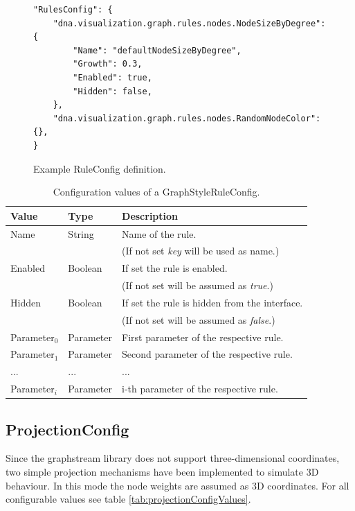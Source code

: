 \begin{figure} [h]
\begin{lstlisting}
"RulesConfig": {
	"dna.visualization.graph.rules.nodes.NodeSizeByDegree": {
		"Name": "defaultNodeSizeByDegree",
		"Growth": 0.3,
		"Enabled": true,
		"Hidden": false,
	},
	"dna.visualization.graph.rules.nodes.RandomNodeColor": {},
}
\end{lstlisting}
\caption{Example RuleConfig definition.}
\label{config:exampleRuleConfig}
\end{figure}

\begin{table}[h]
\caption{Configuration values of a GraphStyleRuleConfig.}
\centering
\begin{tabular}[h]{|l|l|l|}\hline
	\textbf{Value} & \textbf{Type} & \textbf{Description}\\
	\hline
	Name & String & Name of the rule.\\
	& & (If not set \emph{key} will be used as name.)\\
	\hline
	Enabled & Boolean & If set the rule is enabled.\\
	& & (If not set will be assumed as \emph{true}.)\\
	\hline
	Hidden & Boolean & If set the rule is hidden from the interface.\\
	& & (If not set will be assumed as \emph{false}.)\\
	\hline
	Parameter$_0$ & Parameter & First parameter of the respective rule.\\
	\hline
	Parameter$_1$ & Parameter & Second parameter of the respective rule.\\
	\hline
	... & ... & ...\\
	\hline	
	Parameter$_i$ & Parameter & i-th parameter of the respective rule.\\
	\hline
\end{tabular}
\label{tab:graphStyleRuleConfigValues}
\end{table}


\subsection{ProjectionConfig}
\label{ss:projectionConfig}
Since the graphstream library does not support three-dimensional coordinates, two simple projection mechanisms have been implemented to simulate 3D behaviour. In this mode the node weights are assumed as 3D coordinates. For all configurable values see table \ref{tab:projectionConfigValues}.

